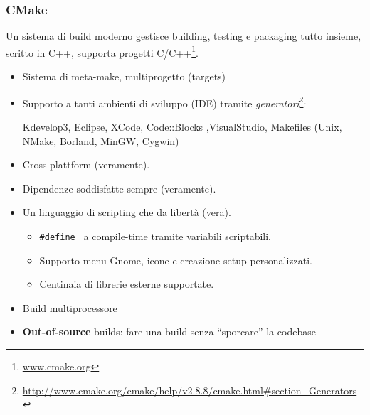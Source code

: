 \documentclass[10pt] {beamer}
\begin{document}

\begin{frame}
\frametitle{CMake}
Un sistema di build moderno gestisce building, testing e packaging tutto insieme, scritto in C++, supporta progetti C/C++\footnote{\url{www.cmake.org}}.
\begin{itemize}
		\item<1-> Sistema di meta-make, multiprogetto (targets)
		\item<2-> Supporto a tanti ambienti di sviluppo (IDE) tramite \emph{generatori}\footnote{\url{http://www.cmake.org/cmake/help/v2.8.8/cmake.html\#section\_Generators}}: 

Kdevelop3, Eclipse, XCode, Code::Blocks ,VisualStudio, Makefiles (Unix, NMake, Borland, MinGW, Cygwin)

		\item<3-> Cross plattform (veramente).
		\item<4-> Dipendenze soddisfatte sempre (veramente).
		\item<5-> Un linguaggio di scripting che da libertà (vera).
		\begin{itemize}
			\item<6-> \texttt{\#define } a compile-time tramite variabili scriptabili.
			\item<7-> Supporto menu Gnome, icone e creazione setup personalizzati.
			\item<8-> Centinaia di librerie esterne supportate.
		\end{itemize}
		\item<9-> Build multiprocessore
		\item<10-> \textbf{Out-of-source} builds: fare una build senza ``sporcare'' la codebase
\end{itemize}
\end{frame}

\end{document}
